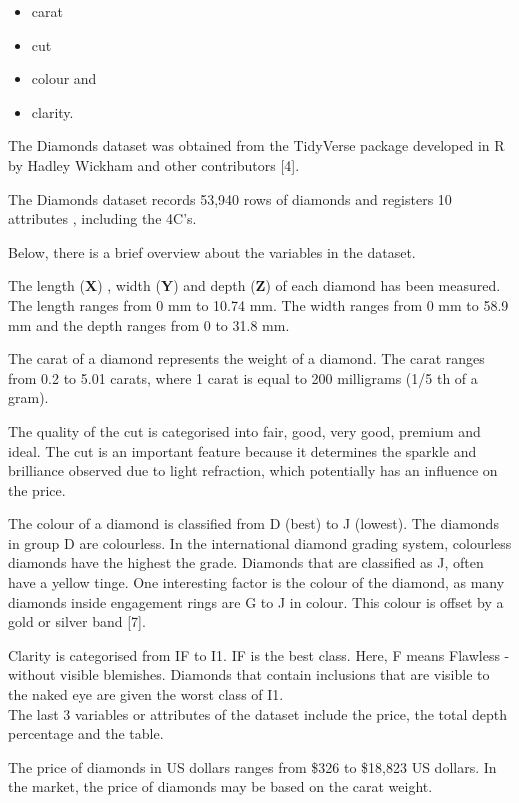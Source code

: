 \documentclass[
]{article}
\providecommand{\tightlist}{%
  \setlength{\itemsep}{0pt}\setlength{\parskip}{0pt}}
\begin{document}
\begin{itemize}
\tightlist
\item
  carat
\item
  cut
\item
  colour and
\item
  clarity.
\end{itemize}

The Diamonds dataset was obtained from the TidyVerse package developed
in R by Hadley Wickham and other contributors {[}4{]}.

The Diamonds dataset records 53,940 rows of diamonds and registers 10
attributes , including the 4C's.

Below, there is a brief overview about the variables in the dataset.

The length (\textbf{X}) , width (\textbf{Y}) and depth (\textbf{Z}) of
each diamond has been measured. The length ranges from 0 mm to 10.74 mm.
The width ranges from 0 mm to 58.9 mm and the depth ranges from 0 to
31.8 mm.

The carat of a diamond represents the weight of a diamond. The carat
ranges from 0.2 to 5.01 carats, where 1 carat is equal to 200 milligrams
(1/5 th of a gram).

The quality of the cut is categorised into fair, good, very good,
premium and ideal. The cut is an important feature because it determines
the sparkle and brilliance observed due to light refraction, which
potentially has an influence on the price.

The colour of a diamond is classified from D (best) to J (lowest). The
diamonds in group D are colourless. In the international diamond grading
system, colourless diamonds have the highest the grade. Diamonds that
are classified as J, often have a yellow tinge. One interesting factor
is the colour of the diamond, as many diamonds inside engagement rings
are G to J in colour. This colour is offset by a gold or silver band
{[}7{]}.

Clarity is categorised from IF to I1. IF is the best class. Here, F
means Flawless - without visible blemishes. Diamonds that contain
inclusions that are visible to the naked eye are given the worst class
of I1.\\
The last 3 variables or attributes of the dataset include the price, the
total depth percentage and the table.

The price of diamonds in US dollars ranges from \$326 to \$18,823 US
dollars. In the market, the price of diamonds may be based on the carat
weight.
\end{document}
